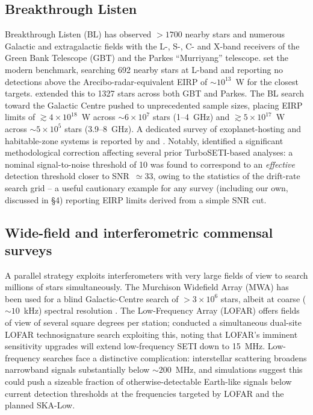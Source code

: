 \documentclass[10pt,twocolumn]{article}
\begin{document}
\subsection{Breakthrough Listen}
Breakthrough Listen (BL) has observed $>1700$ nearby stars and numerous Galactic and extragalactic fields with the L-, S-, C- and X-band receivers of the Green Bank Telescope (GBT) and the Parkes ``Murriyang'' telescope. \citet{enriquez2017} set the modern benchmark, searching 692 nearby stars at L-band and reporting no detections above the Arecibo-radar-equivalent EIRP of $\sim10^{13}$~W for the closest targets. \citet{price2020} extended this to 1327 stars across both GBT and Parkes. The BL search toward the Galactic Centre \citep{gajjar2021} pushed to unprecedented sample sizes, placing EIRP limits of $\gtrsim4\times10^{18}$~W across $\sim6\times10^7$ stars (1--4~GHz) and $\gtrsim5\times10^{17}$~W across $\sim5\times10^5$ stars (3.9--8~GHz). A dedicated survey of exoplanet-hosting and habitable-zone systems is reported by \citet{franz2022} and \citet{sheikh2020}. Notably, \citet{choza2024} identified a significant methodological correction affecting several prior TurboSETI-based analyses: a nominal signal-to-noise threshold of 10 was found to correspond to an \emph{effective} detection threshold closer to SNR~$\simeq33$, owing to the statistics of the drift-rate search grid -- a useful cautionary example for any survey (including our own, discussed in \S4) reporting EIRP limits derived from a simple SNR cut.

\subsection{Wide-field and interferometric commensal surveys}
A parallel strategy exploits interferometers with very large fields of view to search millions of stars simultaneously. The Murchison Widefield Array (MWA) has been used for a blind Galactic-Centre search of $>3\times10^6$ stars, albeit at coarse ($\sim10$~kHz) spectral resolution \citep{tingay2016,tremblay2022}. The Low-Frequency Array (LOFAR) offers fields of view of several square degrees per station; \citet{johnson2023} conducted a simultaneous dual-site LOFAR technosignature search exploiting this, noting that LOFAR's imminent sensitivity upgrades will extend low-frequency SETI down to 15~MHz. Low-frequency searches face a distinctive complication: interstellar scattering broadens narrowband signals substantially below $\sim200$~MHz, and simulations suggest this could push a sizeable fraction of otherwise-detectable Earth-like signals below current detection thresholds at the frequencies targeted by LOFAR and the planned SKA-Low.
\end{document}
